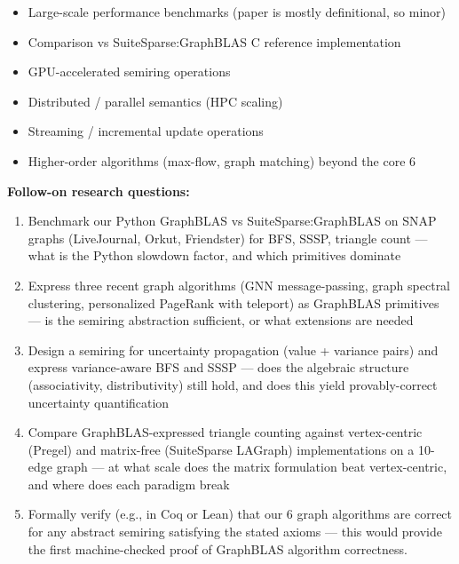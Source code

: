 \begin{itemize}[leftmargin=1.4em,itemsep=0.2em,topsep=0.2em]
\item Large-scale performance benchmarks (paper is mostly definitional, so minor)
\item Comparison vs SuiteSparse:GraphBLAS C reference implementation
\item GPU-accelerated semiring operations
\item Distributed / parallel semantics (HPC scaling)
\item Streaming / incremental update operations
\item Higher-order algorithms (max-flow, graph matching) beyond the core 6
\end{itemize}\noindent\textbf{Follow-on research questions:}
\begin{enumerate}[leftmargin=1.6em,itemsep=0.2em,topsep=0.2em,label=Q\arabic*.]
\item Benchmark our Python GraphBLAS vs SuiteSparse:GraphBLAS on SNAP graphs (LiveJournal, Orkut, Friendster) for BFS, SSSP, triangle count --- what is the Python slowdown factor, and which primitives dominate
\item Express three recent graph algorithms (GNN message-passing, graph spectral clustering, personalized PageRank with teleport) as GraphBLAS primitives --- is the semiring abstraction sufficient, or what extensions are needed
\item Design a semiring for uncertainty propagation (value + variance pairs) and express variance-aware BFS and SSSP --- does the algebraic structure (associativity, distributivity) still hold, and does this yield provably-correct uncertainty quantification
\item Compare GraphBLAS-expressed triangle counting against vertex-centric (Pregel) and matrix-free (SuiteSparse LAGraph) implementations on a 10-edge graph --- at what scale does the matrix formulation beat vertex-centric, and where does each paradigm break
\item Formally verify (e.g., in Coq or Lean) that our 6 graph algorithms are correct for any abstract semiring satisfying the stated axioms --- this would provide the first machine-checked proof of GraphBLAS algorithm correctness.
\end{enumerate}

